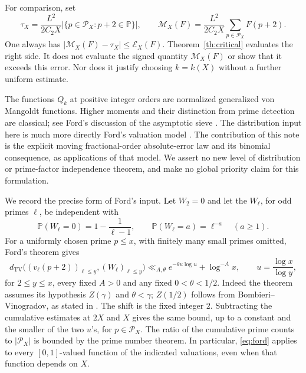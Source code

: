 \documentclass[11pt]{article}
\theoremstyle{remark}
\newcommand{\PP}{\mathbb P}
\newcommand{\TV}{d_{\mathrm{TV}}}
\newcommand{\err}{\mathcal E_X}
\newcommand{\Mcal}{\mathcal M_X}
\begin{document}
For comparison, set
\[
 \tau_X=\frac{L^2}{2C_2X}
       |\{p\in\mathcal P_X:p+2\in\PP\}|,
 \qquad
 \Mcal(F)=\frac{L^2}{2C_2X}\sum_{p\in\mathcal P_X}F(p+2).
\]
One always has $|\Mcal(F)-\tau_X|\le\err(F)$. Theorem~\ref{th:critical}
evaluates the right side. It does not evaluate the signed quantity
$\Mcal(F)$ or show that it exceeds this error. Nor does it justify
choosing $k=k(X)$ without a further uniform estimate.

The functions $Q_k$ at positive integer orders are normalized generalized
von Mangoldt functions. Higher moments and their distinction from prime
detection are classical; see Ford's discussion of the asymptotic sieve
\cite{ford-asymptotic}. The distribution input here is much more directly
Ford's valuation model \cite[Theorem 1]{ford-model}. The contribution of
this note is the explicit moving fractional-order absolute-error law
and its binomial consequence, as applications of that model. We assert
no new level of distribution or prime-factor independence theorem, and
make no global priority claim for this formulation.

We record the precise form of Ford's input. Let $W_2=0$ and let the
$W_\ell$, for odd primes $\ell$, be independent with
\begin{equation}\label{eq:ford-law}
 \mathbb P(W_\ell=0)=1-\frac1{\ell-1},\qquad
 \mathbb P(W_\ell=a)=\ell^{-a}\quad(a\ge1).
\end{equation}
For a uniformly chosen prime $p\le x$, with finitely many small primes
omitted, Ford's theorem gives
\begin{equation}\label{eq:ford}
 \TV\big((v_\ell(p+2))_{\ell\le y},(W_\ell)_{\ell\le y}\big)
 \ll_{A,\theta} e^{-\theta u\log u}+\log^{-A}x,
 \qquad u=\frac{\log x}{\log y},
\end{equation}
for $2\le y\le x$, every fixed $A>0$ and any fixed $0<\theta<1/2$.
Indeed the theorem assumes its hypothesis $Z(\gamma)$ and
$\theta<\gamma$; $Z(1/2)$ follows from Bombieri--Vinogradov, as stated
in \cite{ford-model}. The shift is the fixed integer $2$.
Subtracting the cumulative estimates at $2X$ and $X$ gives the same
bound, up to a constant and the smaller of the two $u$'s, for
$p\in\mathcal P_X$. The ratio of the cumulative prime counts to
$|\mathcal P_X|$ is bounded by the prime number theorem.
In particular, \eqref{eq:ford} applies to every $[0,1]$-valued function
of the indicated valuations, even when that function depends on $X$.
\end{document}
